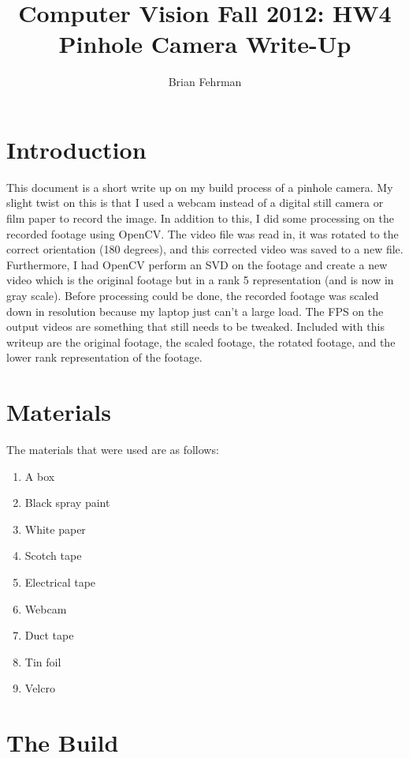 \documentclass[13pt]{article}
\author{Brian Fehrman}
\title{Computer Vision Fall 2012: HW4 Pinhole Camera Write-Up}
\begin{document}
\maketitle

\section{Introduction}
This document is a short write up on my build process of a pinhole camera. My slight twist on this is that I used a webcam instead of a digital still camera or film paper to record the image. In addition to this, I did some processing on the recorded footage using OpenCV. The video file was read in, it was rotated to the correct orientation (180 degrees), and this corrected video was saved to a new file. Furthermore, I had OpenCV perform an SVD on the footage and create a new video which is the original footage but in a rank 5 representation (and is now in gray scale). Before processing could be done, the recorded footage was scaled down in resolution because my laptop just can't a large load. The FPS on the output videos are something that still needs to be tweaked. Included with this writeup are the original footage, the scaled footage, the rotated footage, and the lower rank representation of the footage.

\section{Materials}
The materials that were used are as follows:

\begin{enumerate}
\item A box
\item Black spray paint
\item White paper
\item Scotch tape
\item Electrical tape
\item Webcam
\item Duct tape
\item Tin foil
\item Velcro
\end{enumerate}

\section{The Build}
\end{document}
